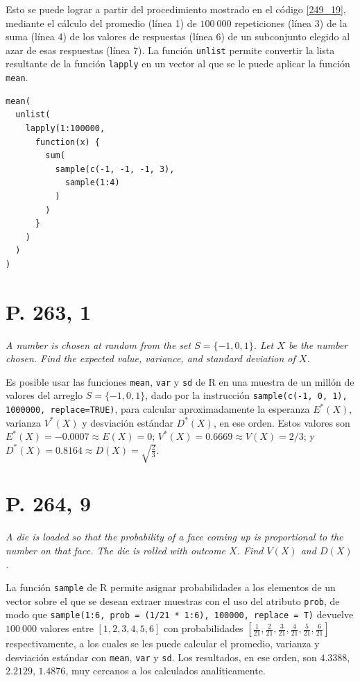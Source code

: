 \documentclass[paper=leter, fontsize=11pt]{scrartcl}
\begin{document}
Esto se puede lograr a partir del procedimiento mostrado en el código \ref{249_19}, mediante el cálculo del promedio (línea 1) de $100\ 000$ repeticiones (línea 3) de la suma (línea 4) de los valores de respuestas (línea 6) de un subconjunto elegido al azar de esas respuestas (línea 7). La función \texttt{unlist} permite convertir la lista resultante de la función \texttt{lapply} en un vector al que se le puede aplicar la función \texttt{mean}.

\begin{lstlisting}[caption={P. 249, 19}, captionpos=t, label=249_19]
mean(
  unlist(
    lapply(1:100000, 
      function(x) {
        sum(
          sample(c(-1, -1, -1, 3), 
            sample(1:4)
          )
        )
      }
    )
  )
)
\end{lstlisting}

\section*{P. 263, 1}
\emph{A number is chosen at random from the set \( S = \lbrace -1, 0, 1 \rbrace \). Let \(X\) be the number chosen. Find the expected value, variance, and standard deviation of \(X\).}

Es posible usar las funciones \texttt{mean}, \texttt{var} y \texttt{sd} de R en una muestra de un millón de valores del arreglo $S = \lbrace -1, 0, 1 \rbrace$, dado por la instrucción \texttt{sample(c(-1, 0, 1), 1000000, replace=TRUE)}, para calcular aproximadamente la esperanza $E^*(X)$, varianza $V^*(X)$ y desviación estándar $D^*(X)$, en ese orden. Estos valores son $E^*(X) = -0.0007 \approx E(X) = 0$; $V^*(X) = 0.6669 \approx V(X) = 2/3$; y $D^*(X) = 0.8164 \approx D(X) = \sqrt{\frac{2}{3}}$.

\section*{P. 264, 9}
\emph{A die is loaded so that the probability of a face coming up is proportional to the number on that face. The die is rolled with outcome $X$. Find $V(X)$ and $D(X)$.}

La función \texttt{sample} de R permite asignar probabilidades a los elementos de un vector sobre el que se desean extraer muestras con el uso del atributo \texttt{prob}, de modo que \texttt{sample(1:6, prob = (1/21 * 1:6), 100000, replace = T)} devuelve $100\ 000$ valores entre $[1, 2, 3, 4, 5, 6]$ con probabilidades $[\frac{1}{21}, \frac{2}{21}, \frac{3}{21}, \frac{4}{21}, \frac{5}{21}, \frac{6}{21}]$ respectivamente, a los cuales se les puede calcular el promedio, varianza y desviación estándar con \texttt{mean}, \texttt{var} y \texttt{sd}. Los resultados, en ese orden, son $4.3388$, $2.2129$, $1.4876$, muy cercanos a los calculados analíticamente.
\end{document}

